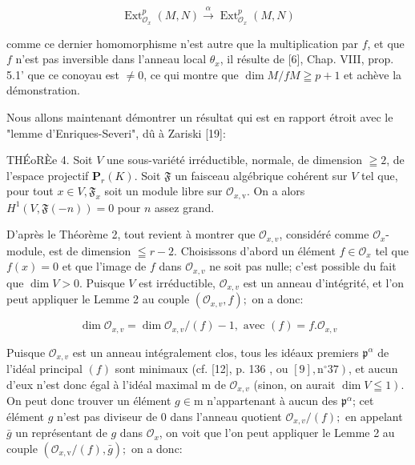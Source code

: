 $$
\operatorname{Ext}_{\mathcal{O}_{x}}^{p}(M, N) \stackrel{\alpha}{\longrightarrow} \operatorname{Ext}_{\mathcal{O}_{x}}^{p}(M, N)
$$

comme ce dernier homomorphisme n'est autre que la multiplication par $f$, et que $f$ n'est pas inversible dans l'anneau local $\theta_{x}$, il résulte de [6], Chap. VIII, prop. 5.1' que ce conoyau est $\neq 0$, ce qui montre que $\operatorname{dim} M / f M \geqq p+1$ et achève la démonstration.

Nous allons maintenant démontrer un résultat qui est en rapport étroit avec le "lemme d'Enriques-Severi", dû à Zariski [19]:

THÉoRÈe 4. Soit $V$ une sous-variété irréductible, normale, de dimension $\geqq 2$, de l'espace projectif $\mathbf{P}_{r}(K) .$ Soit $\mathfrak{F}$ un faisceau algébrique cohérent sur $V$ tel que, pour tout $x \in V, \mathfrak{F}_{x}$ soit un module libre sur $\mathcal{O}_{x, \mathrm{v}} .$ On a alors $H^{1}(V, \mathfrak{F}(-n))=0$ pour $n$ assez grand.

D'après le Théorème 2, tout revient à montrer que $\mathcal{O}_{x, v}$, considéré comme $\mathcal{O}_{x}$-module, est de dimension $\leqq r-2$. Choisissons d'abord un élément $f \in \mathcal{O}_{x}$ tel que $f(x)=0$ et que l'image de $f$ dans $\mathcal{O}_{x, v}$ ne soit pas nulle; c'est possible $\mathrm{du}$ fait que $\operatorname{dim} V>0 .$ Puisque $V$ est irréductible, $\mathcal{O}_{x, v}$ est un anneau d'intégrité, et l'on peut appliquer le Lemme 2 au couple $\left(\mathcal{O}_{x, v}, f\right) ;$ on a donc:

$$
\operatorname{dim} \mathcal{O}_{x, v}=\operatorname{dim} \mathcal{O}_{x, v} /(f)-1, \text { avec }(f)=f . \mathcal{O}_{x, v}
$$

Puisque $\mathcal{O}_{x, v}$ est un anneau intégralement clos, tous les idéaux premiers $\mathfrak{p}^{\alpha}$ de l'idéal principal $(f)$ sont minimaux (cf. [12], p. 136 , ou $\left.[9], \mathrm{n}^{\circ} 37\right)$, et aucun d'eux n'est donc égal à l'idéal maximal $\mathrm{m}$ de $\mathcal{O}_{x, v}$ (sinon, on aurait $\left.\operatorname{dim} V \leqq 1\right)$. On peut donc trouver un élément $g \in \mathrm{m}$ n'appartenant à aucun des $\mathfrak{p}^{\alpha}$; cet élément $g$ n'est pas diviseur de 0 dans l'anneau quotient $\mathcal{O}_{x, v} /(f) ;$ en appelant $\bar{g}$ un représentant de $g$ dans $\mathcal{O}_{x}$, on voit que l'on peut appliquer le Lemme 2 au couple $\left(\mathcal{O}_{x, \mathrm{v}} /(f), \bar{g}\right) ;$ on a donc:

